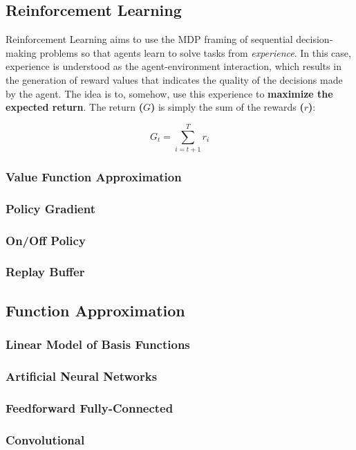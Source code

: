 \subsection{Reinforcement Learning}
Reinforcement Learning aims to use the MDP framing of sequential decision-making problems so that agents learn to solve tasks from \emph{experience}. In this case, experience is understood as the agent-environment interaction, which results in the generation of reward values that indicates the quality of the decisions made by the agent. The idea is to, somehow, use this experience to \textbf{maximize the expected return}. The return \textbf{($G$)} is simply the sum of the rewards \textbf{($r$)}:

\begin{equation}
G_{t} = \sum_{i=t+1}^{T}r_{i}
\end{equation}


\subsubsection{Value Function Approximation}
\subsubsection{Policy Gradient}
\subsubsection{On/Off Policy}
\subsubsection{Replay Buffer}


\subsection{Function Approximation}
\subsubsection{Linear Model of Basis Functions}
\subsubsection{Artificial Neural Networks}
\subsubsection{Feedforward Fully-Connected}
\subsubsection{Convolutional}

